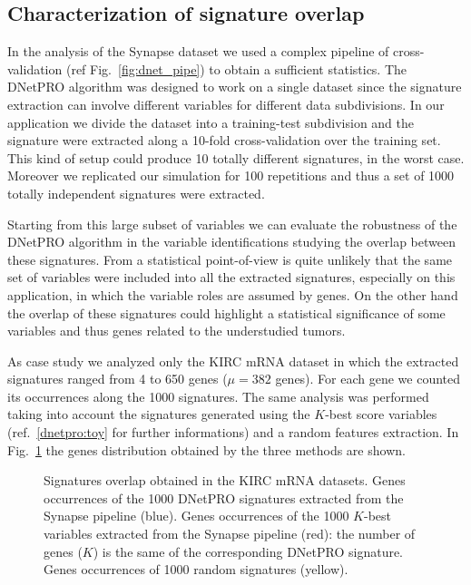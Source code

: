 \documentclass{standalone}
\begin{document}
\subsection[Signature Overlap]{Characterization of signature overlap}\label{synapse:overlap}

In the analysis of the Synapse dataset we used a complex pipeline of cross-validation (ref Fig.~\ref{fig:dnet_pipe}) to obtain a sufficient statistics.
The DNetPRO algorithm was designed to work on a single dataset since the signature extraction can involve different variables for different data subdivisions.
In our application we divide the dataset into a training-test subdivision and the signature were extracted along a 10-fold cross-validation over the training set.
This kind of setup could produce 10 totally different signatures, in the worst case.
Moreover we replicated our simulation for 100 repetitions and thus a set of 1000 totally independent signatures were extracted.

Starting from this large subset of variables we can evaluate the robustness of the DNetPRO algorithm in the variable identifications studying the overlap between these signatures.
From a statistical point-of-view is quite unlikely that the same set of variables were included into all the extracted signatures, especially on this application, in which the variable roles are assumed by genes.
On the other hand the overlap of these signatures could highlight a statistical significance of some variables and thus genes related to the understudied tumors.

As case study we analyzed only the KIRC mRNA dataset in which the extracted signatures ranged from 4 to 650 genes ($\mu=382$ genes).
For each gene we counted its occurrences along the 1000 signatures.
The same analysis was performed taking into account the signatures generated using the $K$-best score variables (ref.~\ref{dnetpro:toy} for further informations) and a random features extraction.
In Fig.~\ref{fig:overlap} the genes distribution obtained by the three methods are shown.

\begin{figure}[htbp]
\centering
\def\svgwidth{0.6\textwidth}

\caption{Signatures overlap obtained in the KIRC mRNA datasets.
Genes occurrences of the 1000 DNetPRO signatures extracted from the Synapse pipeline (blue).
Genes occurrences of the 1000 $K$-best variables extracted from the Synapse pipeline (red): the number of genes ($K$) is the same of the corresponding DNetPRO signature.
Genes occurrences of 1000 random signatures (yellow).
}
\label{fig:overlap}
\end{figure}
\end{document}
